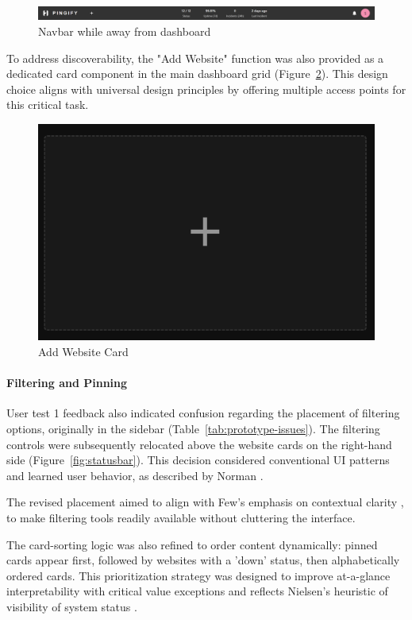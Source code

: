 {\begin{figure}[H]
    \centering
    \includegraphics[width=1\linewidth]{figures/navbar-status.png}
    \caption{Navbar while away from dashboard}
    \label{fig:navbar_status}
\end{figure}

To address discoverability, the "Add Website" function was also provided as a dedicated card component in the main dashboard grid (Figure~\ref{fig:addwebsitecard}). This design choice aligns with universal design principles by offering multiple access points for this critical task.

\begin{figure}[H]
    \centering
    \includegraphics[width=0.5\linewidth]{figures/addwebsitecard.png}
    \caption{Add Website Card}
    \label{fig:addwebsitecard}
\end{figure}

\paragraph{Filtering and Pinning}
User test 1 feedback also indicated confusion regarding the placement of filtering options, originally in the sidebar (Table~\ref{tab:prototype-issues}). The filtering controls were subsequently relocated above the website cards on the right-hand side (Figure~\ref{fig:statusbar}). This decision considered conventional UI patterns and learned user behavior, as described by Norman \parencite{sharp-2019}.

The revised placement aimed to align with Few’s emphasis on contextual clarity  \parencite{FewDashboard}, to make filtering tools readily available without cluttering the interface.

The card-sorting logic was also refined to order content dynamically: pinned cards appear first, followed by websites with a 'down' status, then alphabetically ordered cards. This prioritization strategy was designed to improve at-a-glance interpretability with critical value exceptions and reflects Nielsen's heuristic of visibility of system status \parencite{Nielsen1994}. 

}
